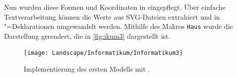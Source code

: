 Nun wurden diese Formen und Koordinaten in \Povray eingepflegt. Über einfache Textverarbeitung können die Werte aus SVG-Dateien extrahiert und in \Povray"=Deklarationen umgewandelt werden. Mithilfe des Makros \texttt{Haus} wurde die Darstellung gerendert, die in \autoref{fig:ikum3} dargestellt ist.

\begin{figure}[h]
	\centering
	\texttt{[image: Landscape/Informatikum/Informatikum3]}
	\caption{Implementierung des ersten Modells mit \Povray.}
	\label{fig:ikum3}
\end{figure}